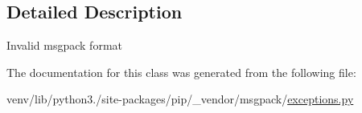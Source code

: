 \subsection{Detailed Description}
\begin{DoxyVerb}Invalid msgpack format\end{DoxyVerb}
 

The documentation for this class was generated from the following file\+:\begin{DoxyCompactItemize}
\item 
venv/lib/python3./site-\/packages/pip/\+\_\+vendor/msgpack/\hyperlink{pip_2__vendor_2msgpack_2exceptions_8py}{exceptions.\+py}\end{DoxyCompactItemize}
